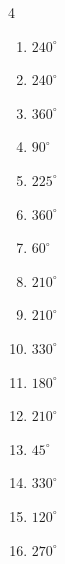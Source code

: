 \begin{multicols}{4}
\begin{enumerate}
  \item $\displaystyle 240^{\circ}$

  \item $\displaystyle 240^{\circ}$

  \item $\displaystyle 360^{\circ}$
        \phantom{$\displaystyle =2\pi$}

  \item $\displaystyle 90^{\circ}$

  \item $\displaystyle 225^{\circ}$

  \item $\displaystyle 360^{\circ}$
        \phantom{$\displaystyle =2\pi$}

  \item $\displaystyle 60^{\circ}$

  \item $\displaystyle 210^{\circ}$

  \item $\displaystyle 210^{\circ}$

  \item $\displaystyle 330^{\circ}$

  \item $\displaystyle 180^{\circ}$
        \phantom{$\displaystyle =\pi$}

  \item $\displaystyle 210^{\circ}$

\columnbreak %

  \item $\displaystyle 45^{\circ}$

  \item $\displaystyle 330^{\circ}$

  \item $\displaystyle 120^{\circ}$

  \item $\displaystyle 270^{\circ}$


\end{enumerate}
\end{multicols}
